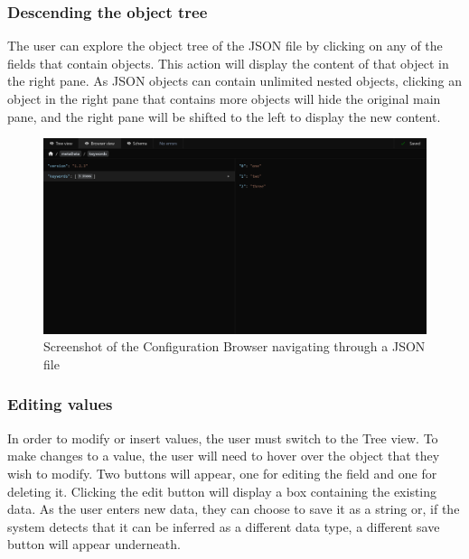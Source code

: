 \subsubsection{Descending the object tree}

The user can explore the object tree of the JSON file by clicking on any of the fields that contain objects. This action will display the content of that object in the right pane. As JSON objects can contain unlimited nested objects, clicking an object in the right pane that contains more objects will hide the original main pane, and the right pane will be shifted to the left to display the new content.

\begin{figure}[!ht]
   \begin{minipage}{1\textwidth}
     \centering
     \includegraphics[width=.95\textwidth]{Figures/browser/descending-crop.pdf}
     \caption[Configuration browser navigation]{Screenshot of the Configuration Browser navigating through a JSON file}
     \label{descending:browser}
   \end{minipage}\hfill
\end{figure}

\subsubsection{Editing values}

In order to modify or insert values, the user must switch to the Tree view. To make changes to a value, the user will need to hover over the object that they wish to modify. Two buttons will appear, one for editing the field and one for deleting it. Clicking the edit button will display a box containing the existing data. As the user enters new data, they can choose to save it as a string or, if the system detects that it can be inferred as a different data type, a different save button will appear underneath. \\

